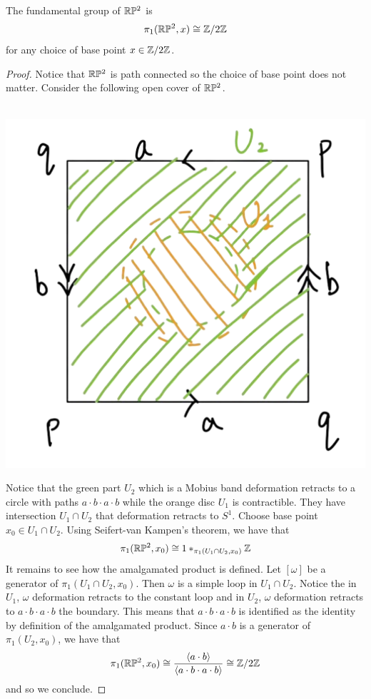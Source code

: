 \documentclass[a4paper]{article}
\begin{document}
\begin{thm}{}{} The fundamental group of $\mathbb{R}\mathbb{P}^2$ is $$\pi_1(\mathbb{R}\mathbb{P}^2,x)\cong\mathbb{Z}/2\mathbb{Z}$$ for any choice of base point $x\in\mathbb{Z}/2\mathbb{Z}$. \tcbline
\begin{proof}
Notice that $\mathbb{R}\mathbb{P}^2$ is path connected so the choice of base point does not matter. Consider the following open cover of $\mathbb{R}\mathbb{P}^2$. \\~\\

\begin{center}
\includegraphics[scale = 0.3]{Image 1}
\end{center}

Notice that the green part $U_2$ which is a Mobius band deformation retracts to a circle with paths $a\cdot b\cdot a\cdot b$ while the orange disc $U_1$ is contractible. They have intersection $U_1\cap U_2$ that deformation retracts to $S^1$. Choose base point $x_0\in U_1\cap U_2$. Using Seifert-van Kampen's theorem, we have that $$\pi_1(\mathbb{R}\mathbb{P}^2,x_0)\cong1\ast_{\pi_1(U_1\cap U_2,x_0)}\mathbb{Z}$$ It remains to see how the amalgamated product is defined. Let $[\omega]$ be a generator of $\pi_1(U_1\cap U_2,x_0)$. Then $\omega$ is a simple loop in $U_1\cap U_2$. Notice the in $U_1$, $\omega$ deformation retracts to the constant loop and in $U_2$, $\omega$ deformation retracts to $a\cdot b\cdot a\cdot b$ the boundary. This means that $a\cdot b\cdot a\cdot b$ is identified as the identity by definition of the amalgamated product. Since $a\cdot b$ is a generator of $\pi_1(U_2,x_0)$, we have that $$\pi_1(\mathbb{R}\mathbb{P}^2,x_0)\cong\frac{\langle a\cdot b\rangle}{\langle a\cdot b\cdot a\cdot b\rangle}\cong\mathbb{Z}/2\mathbb{Z}$$ and so we conclude. 
\end{proof}
\end{thm}
\end{document}

